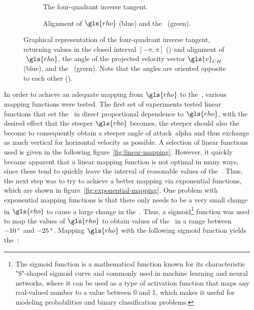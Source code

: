     \begin{figure}[htb]%
        \centering%
        \begin{subfigure}{0.5\linewidth}%
            \centering%
            
            \caption{The four-quadrant inverse tangent.}
            \label{fig:atan2}
        \end{subfigure}%
        \hfil%
        \begin{subfigure}{0.5\linewidth}%
            
            \caption{Alignment of$~\gls{rho}$ (blue) and the~ (green).}
            \label{fig:lambda-aea}
        \end{subfigure}%
        \caption{Graphical representation of the four-quadrant inverse tangent, returning values in the closed interval $\left[-\pi, \pi\right]$ () and alignment of$~\gls{rho}$, the angle of the projected velocity vector$~\gls{v}_{CH}$ (blue), and the~ (green). Note that the angles are oriented opposite to each other ().}%
        \label{fig:lambda-proj}%
    \end{figure}%
    
    In order to achieve an adequate mapping from$~\gls{rho}$ to the~, various mapping functions were tested. The first set of experiments tested linear functions that set the~ in direct proportional dependence to$~\gls{rho}$, with the desired effect that the steeper$~\gls{rho}$ becomes, the steeper should also the~ become to consequently obtain a steeper angle of attack~\gls{alpha} and thus exchange as much vertical for horizontal velocity as possible. A selection of linear functions used is given in the following figure~\ref{fig:linear-mapping}. However, it quickly became apparent that a linear mapping function is not optimal in many ways, since these tend to quickly leave the interval of reasonable values of the~. Thus, the next step was to try to achieve a better mapping via exponential functions, which are shown in figure~\ref{fig:exponential-mapping}. One problem with exponential mapping functions is that there only needs to be a very small change in$~\gls{rho}$ to cause a large change in the~. Thus, a sigmoid\footnote{The sigmoid function is a mathematical function known for its characteristic "S"-shaped sigmoid curve and commonly used in machine learning and neural networks, where it can be used as a type of activation function that maps any real-valued number to a value between 0 and 1, which makes it useful for modeling probabilities and binary classification problems.} function was used to map the values of$~\gls{rho}$ to obtain values of the~ in a range between $-10\,\textrm{\si{\degree}}$ and $-25\,\textrm{\si{\degree}}$. Mapping$~\gls{rho}$ with the following sigmoid function yields the~:

